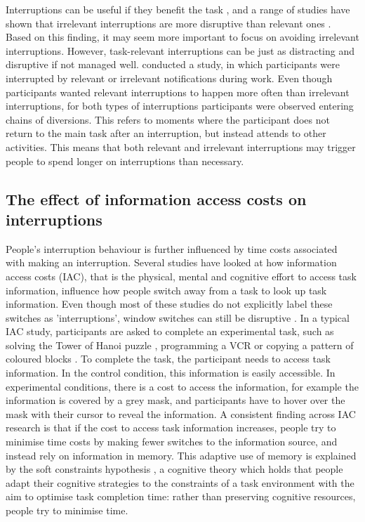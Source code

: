 Interruptions can be useful if they benefit the task \citep{Jin2009}, and a range of studies have shown that irrelevant interruptions are more disruptive than relevant ones \citep{Adamczyk2004, Gould2013a}. Based on this finding, it may seem more important to focus on avoiding irrelevant interruptions. However, task-relevant interruptions can be just as distracting and disruptive if not managed well. \citet{Iqbal2008} conducted a study, in which participants were interrupted by relevant or irrelevant notifications during work. Even though participants wanted relevant interruptions to happen more often than irrelevant interruptions, for both types of interruptions participants were observed entering chains of diversions. This refers to moments where the participant does not return to the main task after an interruption, but instead attends to other activities. This means that both relevant and irrelevant interruptions may trigger people to spend longer on interruptions than necessary.

\subsection{The effect of information access costs on interruptions}
People’s interruption behaviour is further influenced by time costs associated with making an interruption. Several studies have looked at how information access costs (IAC), that is the physical, mental and cognitive effort to access task information, influence how people switch away from a task to look up task information. Even though most of these studies do not explicitly label these switches as 'interruptions', window switches can still be disruptive \citep{Rule2013}. In a typical IAC study, participants are asked to complete an experimental task, such as solving the Tower of Hanoi puzzle \citep{Waldron2007}, programming a VCR \citep{Gray2004} or copying a pattern of coloured blocks \citep{Gray2006}. To complete the task, the participant needs to access task information. In the control condition, this information is easily accessible. In experimental conditions, there is a cost to access the information, for example the information is covered by a grey mask, and participants have to hover over the mask with their cursor to reveal the information. A consistent finding across IAC research is that if the cost to access task information increases, people try to minimise time costs by making fewer switches to the information source, and instead rely on information in memory. This adaptive use of memory is explained by the soft constraints hypothesis \citep{Gray2006}, a cognitive theory which holds that people adapt their cognitive strategies to the constraints of a task environment with the aim to optimise task completion time: rather than preserving cognitive resources, people try to minimise time.

